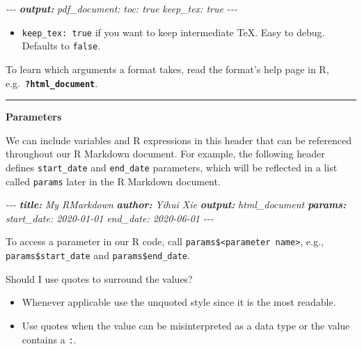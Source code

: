 \documentclass[
  a4paper,
  twoside,
  openright]{book}
\newenvironment{Shaded}{\begin{snugshade}}{\end{snugshade}}
\newcommand{\AnnotationTok}[1]{\textcolor[rgb]{0.56,0.35,0.01}{\textbf{\textit{#1}}}}
\newcommand{\CommentTok}[1]{\textcolor[rgb]{0.56,0.35,0.01}{\textit{#1}}}
\providecommand{\tightlist}{%
  \setlength{\itemsep}{0pt}\setlength{\parskip}{0pt}}
\theoremstyle{definition}
\theoremstyle{definition}
\theoremstyle{definition}
\theoremstyle{definition}
\theoremstyle{remark}
\begin{document}
\begin{itemize}
\begin{Shaded}
\begin{Highlighting}[]
\CommentTok{{-}{-}{-}}
\AnnotationTok{output:}
\CommentTok{  pdf\_document:}
\CommentTok{    toc: true}
\CommentTok{    keep\_tex: true}
\CommentTok{{-}{-}{-}}
\end{Highlighting}
\end{Shaded}

  \begin{itemize}
  \tightlist
  \item
    \texttt{keep\_tex:\ true} if you want to keep intermediate TeX. Easy to debug. Defaults to \texttt{false}.
  \end{itemize}

  To learn which arguments a format takes, read the format's help page in R, e.g.~{\textbf{\texttt{?html\_document}}}.
\end{itemize}

\begin{center}\rule{0.5\linewidth}{0.5pt}\end{center}

\textbf{Parameters}

We can include variables and R expressions in this header that can be referenced throughout our R Markdown document. For example, the following header defines \texttt{start\_date} and \texttt{end\_date} parameters, which will be reflected in a list called \texttt{params} later in the R Markdown document.

\begin{Shaded}
\begin{Highlighting}[]
\CommentTok{{-}{-}{-}}
\AnnotationTok{title:}\CommentTok{ My RMarkdown}
\AnnotationTok{author:}\CommentTok{ Yihui Xie}
\AnnotationTok{output:}\CommentTok{ html\_document}
\AnnotationTok{params:}
\CommentTok{  start\_date: \textquotesingle{}2020{-}01{-}01\textquotesingle{}}
\CommentTok{  end\_date: \textquotesingle{}2020{-}06{-}01\textquotesingle{}}
\CommentTok{{-}{-}{-}}
\end{Highlighting}
\end{Shaded}

To access a parameter in our R code, call \texttt{params\$\textless{}parameter\ name\textgreater{}}, e.g., \texttt{params\$start\_date} and \texttt{params\$end\_date}.

Should I use quotes to surround the values?

\begin{itemize}
\tightlist
\item
  Whenever applicable use the unquoted style since it is the most readable.
\item
  Use quotes when the value can be misinterpreted as a data type or the value contains a \texttt{:}.
\end{itemize}
\end{document}
